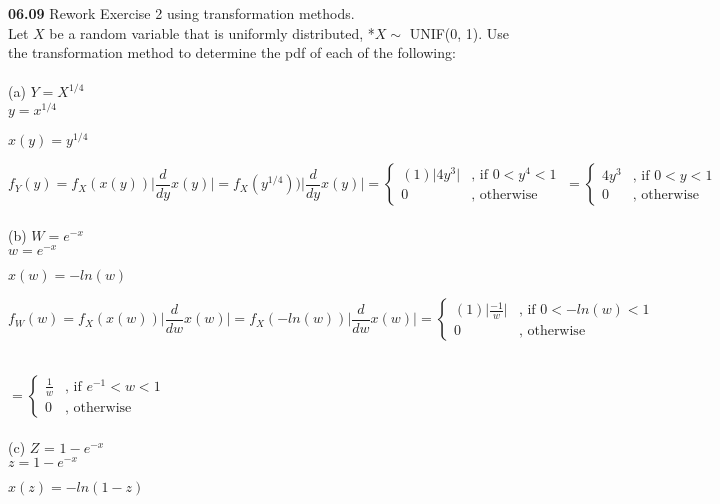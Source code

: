 \textbf{06.09} Rework Exercise 2 using transformation methods. 
\vspace{0.25in}\\
Let $X$ be a random variable that is uniformly distributed, *$X \sim$ UNIF(0, 1). Use the transformation
method to determine the pdf of each of the following:\\
\vspace{0.25in}\\ 
(a) $Y = X^{1/4}$ \\

$y = x^{1/4}$\par
$x(y) = y^{1/4}$

$f_Y(y) = f_X(x(y)) \bigg| \dfrac{d}{dy} x(y) \bigg|
= f_X(y^{1/4})) \bigg| \dfrac{d}{dy} x(y) \bigg|
=\begin{cases}
	(1) \Big| 4y^3 \Big| & \text{,	if }0<y^4<1\\
	0 & \text{,		otherwise}
\end{cases}\
=\begin{cases}
	4y^3  & \text{,	if }0<y<1 \\
	0 & \text{,		otherwise}
\end{cases}
$\\
\vspace{0.25in}\\
(b) $W = e^{-x}$\\

$w = e^{-x}$\par 
$x(w) = -ln(w)$

$f_W(w) = f_X(x(w)) \bigg| \dfrac{d}{dw} x(w) \bigg|
= f_X(-ln(w)) \bigg| \dfrac{d}{dw} x(w) \bigg|
=\begin{cases}
	(1) \Big| \frac{-1}{w} \Big|  & \text{,	if } 0<-ln(w)<1 \\
	0 & \text{,		otherwise}
\end{cases} $\\ 
\vspace{1mm}\\
\par \hspace{3.55in}
$=\begin{cases}
	\frac{1}{w}  & \text{,	if } e^{-1}<w<1 \\
	0 & \text{,		otherwise}
\end{cases}
$\\
\vspace{0.25in}\\
(c) $Z$ = $1-e^{-x}$\\

$z = 1-e^{-x}$\par
$x(z) = -ln(1-z)$

